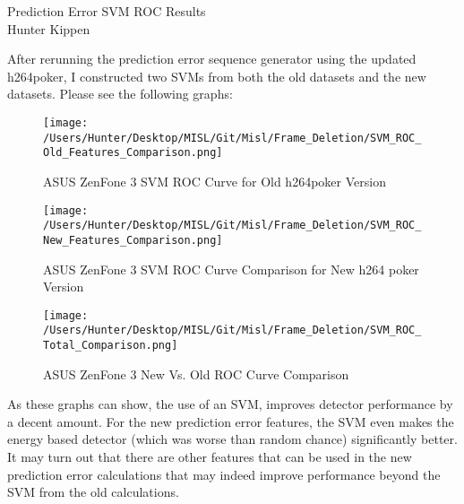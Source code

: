 \documentclass[12pt]{article}%
\begin{document}
\begin{center}
{\LARGE Prediction Error SVM ROC Results}\\
\vspace{0.5em}
{\Large Hunter Kippen}
\vspace{0.5em}
\end{center}


After rerunning the prediction error sequence generator using the updated h264poker, I constructed two SVMs from both the old datasets and the new datasets. Please see the following graphs:

\begin{figure}[h]
  \centering
  \texttt{[image: /Users/Hunter/Desktop/MISL/Git/Misl/Frame\_Deletion/SVM\_ROC\_Old\_Features\_Comparison.png]}
  \caption{ASUS ZenFone 3 SVM ROC Curve for Old h264poker Version}
  \label{fig:ROC1}
\end{figure}


\begin{figure}[h]
  \centering
  \texttt{[image: /Users/Hunter/Desktop/MISL/Git/Misl/Frame\_Deletion/SVM\_ROC\_New\_Features\_Comparison.png]}
  \caption{ASUS ZenFone 3 SVM ROC Curve Comparison for New h264 poker Version}
  \label{fig:ROC2}
\end{figure}


\begin{figure}[h]
  \centering
  \texttt{[image: /Users/Hunter/Desktop/MISL/Git/Misl/Frame\_Deletion/SVM\_ROC\_Total\_Comparison.png]}
  \caption{ASUS ZenFone 3 New Vs. Old ROC Curve Comparison}
  \label{fig:ROC3}
\end{figure}

As these graphs can show, the use of an SVM, improves detector performance by a decent amount. For the new prediction error features, the SVM even makes the energy based detector (which was worse than random chance) significantly better. It may turn out that there are other features that can be used in the new prediction error calculations that may indeed improve performance beyond the SVM from the old calculations.


\begin{comment}
\pagebreak
%


%
\end{comment}
\end{document}
